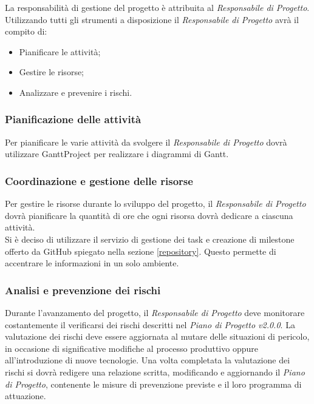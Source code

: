 La responsabilità di gestione del progetto è attribuita al \textit{Responsabile di Progetto}. \\
Utilizzando tutti gli strumenti a disposizione il \textit{Responsabile di Progetto} avrà il compito di:
\begin{itemize}
	\item Pianificare le attività;
	\item Gestire le risorse;
	\item Analizzare e prevenire i rischi.
\end{itemize}

\subsubsection{Pianificazione delle attività}
Per pianificare le varie attività da svolgere il \textit{Responsabile di Progetto} dovrà utilizzare \gls{GanttProject} per realizzare i diagrammi di \gls{Gantt}.

\subsubsection{Coordinazione e gestione delle risorse}
Per gestire le risorse durante lo sviluppo del progetto, il \textit{Responsabile di Progetto} dovrà pianificare la quantità di ore che ogni risorsa dovrà dedicare a ciascuna attività.\\
Si è deciso di utilizzare il servizio di gestione dei \gls{task} e creazione di \gls{milestone} offerto da \gls{GitHub} spiegato nella sezione \ref{repository}. Questo permette di accentrare le informazioni in un solo ambiente.

\subsubsection{Analisi e prevenzione dei rischi}
Durante l'avanzamento del progetto, il \textit{Responsabile di Progetto} deve monitorare costantemente il verificarsi dei rischi descritti nel \textit{Piano di Progetto v2.0.0}. La valutazione dei rischi deve essere aggiornata al mutare delle situazioni di pericolo, in occasione di significative modifiche al processo produttivo oppure all'introduzione di nuove tecnologie. Una volta completata la valutazione dei rischi si dovrà redigere una relazione scritta, modificando e aggiornando il \textit{Piano di Progetto}, contenente le misure di prevenzione previste e il loro programma di attuazione.
